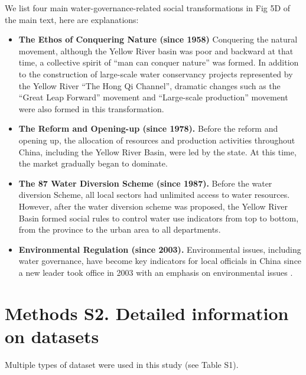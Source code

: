 \documentclass[9pt,twoside,lineno]{pnas-new}
\begin{document}
We list four main water-governance-related social transformations in Fig 5D of the main text, here are explanations: 

\begin{itemize}
    \item \textbf{The Ethos of Conquering Nature (since 1958)} Conquering the natural movement, although the Yellow River basin was poor and backward at that time, a collective spirit of ``man can conquer nature'' was formed. In addition to the construction of large-scale water conservancy projects represented by the Yellow River ``The Hong Qi Channel'', dramatic changes such as the ``Great Leap Forward'' movement and ``Large-scale production'' movement were also formed in this transformation. 
    \item \textbf{The Reform and Opening-up (since 1978).} Before the reform and opening up, the allocation of resources and production activities throughout China, including the Yellow River Basin, were led by the state. At this time, the market gradually began to dominate. 
    \item \textbf{The 87 Water Diversion Scheme (since 1987).} Before the water diversion Scheme, all local sectors had unlimited access to water resources. However, after the water diversion scheme was proposed, the Yellow River Basin formed social rules to control water use indicators from top to bottom, from the province to the urban area to all departments. 
    \item \textbf{Environmental Regulation (since 2003).} Environmental issues, including water governance, have become key indicators for local officials in China since a new leader took office in 2003 with an emphasis on environmental issues 
    \cite{heWateringEnvironmentalRegulation2020}. 
\end{itemize}



\newpage
\section*{Methods S2. Detailed information on datasets}

Multiple types of dataset were used in this study (see Table S1). 
\end{document}
